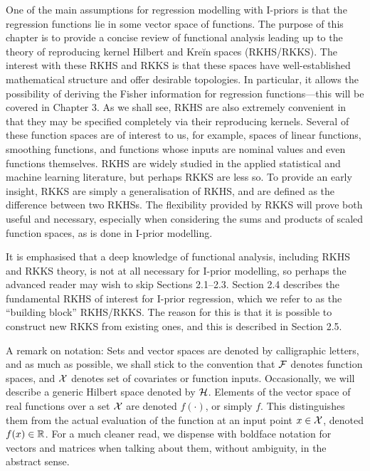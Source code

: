 \documentclass[a4paper,showframe,11pt]{report}
\begin{document}

One of the main assumptions for regression modelling with I-priors is that the regression functions lie in some vector space of functions.
The purpose of this chapter is to provide a concise review of functional analysis leading up to the theory of reproducing kernel Hilbert and Kreĭn spaces (RKHS/RKKS).
The interest with these RKHS and RKKS is that these spaces have well-established mathematical structure and offer desirable topologies.
In particular, it allows the possibility of deriving the Fisher information for regression functions---this will be covered in Chapter 3.
As we shall see, RKHS are also extremely convenient in that they may be specified completely via their reproducing kernels.
Several of these function spaces are of interest to us, for example, spaces of linear functions, smoothing functions, and functions whose inputs are nominal values and even functions themselves.
RKHS are widely studied in the applied statistical and machine learning literature, but perhaps RKKS are less so.
To provide an early insight, RKKS are simply a generalisation of RKHS, and are defined as the difference between two RKHSs.
The flexibility provided by RKKS will prove both useful and necessary, especially when considering the sums and products of scaled function spaces, as is done in I-prior modelling.

It is emphasised that a deep knowledge of functional analysis, including RKHS and RKKS theory, is not at all necessary for I-prior modelling, so perhaps the advanced reader may wish to skip Sections 2.1--2.3. 
Section 2.4 describes the fundamental RKHS of interest for I-prior regression, which we refer to as the ``building block'' RKHS/RKKS.
The reason for this is that it is possible to construct new RKKS from existing ones, and this is described in Section 2.5.

A remark on notation: 
Sets and vector spaces are denoted by calligraphic letters, and as much as possible, we shall stick to the convention that ${\mathcal F}$ denotes function spaces, and ${\mathcal X}$ denotes set of covariates or function inputs. 
Occasionally, we will describe a generic Hilbert space denoted by ${\mathcal H}$.
Elements of the vector space of real functions over a set ${\mathcal X}$ are denoted $f(\cdot)$, or simply $f$.
This distinguishes them from the actual evaluation of the function at an input point $x \in {\mathcal X}$, denoted $f(x) \in \mathbb{R}$.
For a much cleaner read, we dispense with boldface notation for vectors and matrices when talking about them, without ambiguity, in the abstract sense. 
\end{document}
